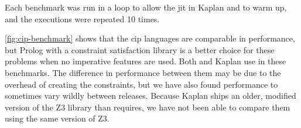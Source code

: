 Each benchmark was run in a loop to allow the \ac{jit} in Kaplan and
\toolname to warm up, and the executions were repeated 10 times.



\autoref{fig:cip-benchmark} shows that the \ac{cip} languages are
comparable in performance, but Prolog with a constraint satisfaction
library is a better choice for these problems when no imperative
features are used. Both \toolname and Kaplan use \zthree in these
benchmarks. The difference in performance between them may be due to
the overhead of creating the constraints, but we have also found
\zthree performance to sometimes vary wildly between releases. Because
Kaplan ships an older, modified version of the Z3 library than
\toolname requires, we have not been able to compare them using the same
version of Z3.

